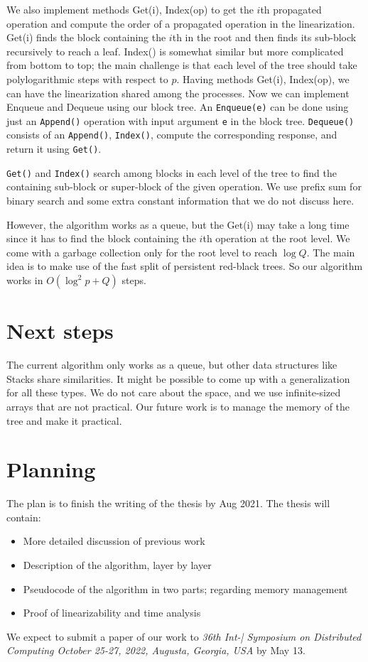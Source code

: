 \documentclass[12pt]{article}
\begin{document}
We also implement methods Get(i), Index(op) to get the $i$th propagated operation and compute the order of a propagated operation in the linearization. Get(i) finds the block containing the $i$th in the root and then finds its sub-block recursively to reach a leaf. Index() is somewhat similar but more complicated from bottom to top; the main challenge is that each level of the tree should take polylogarithmic steps with respect to $p$. Having methods Get(i), Index(op), we can have the linearization shared among the processes. Now we can implement Enqueue and Dequeue using our block tree. An \texttt{Enqueue(e)} can be done using just an \texttt{Append()} operation with input argument \texttt{e} in the block tree. \texttt{Dequeue()} consists of an \texttt{Append()}, \texttt{Index()}, compute the corresponding response, and return it using \texttt{Get()}.

\texttt{Get()} and \texttt{Index()} search among blocks in each level of the tree to find the containing sub-block or super-block of the given operation. We use prefix sum for binary search and some extra constant information that we do not discuss here.

However, the algorithm works as a queue, but the Get(i)  may take a long time since it has to find the block containing the $i$th operation at the root level. We come with a garbage collection only for the root level to reach $\log Q$. The main idea is to make use of the fast split of persistent red-black trees. So our algorithm works in $O(\log^2 p +Q)$ steps.

\section{Next steps}
The current algorithm only works as a queue, but other data structures like Stacks share similarities. It might be possible to come up with a generalization for all these types. We do not care about the space, and we use infinite-sized arrays that are not practical. Our future work is to manage the memory of the tree and make it practical.

\section{Planning}
The plan is to finish the writing of the thesis by Aug 2021. The thesis will contain:
\begin{itemize}
  \item More detailed discussion of previous work
  \item Description of the algorithm, layer by layer
  \item Pseudocode of the algorithm in two parts; regarding memory management
  \item Proof of linearizability and time analysis
\end{itemize}

We expect to submit a paper of our work to \textit{36th Int-| Symposium on Distributed Computing
October 25-27, 2022, Augusta, Georgia, USA} by May 13.

 

\end{document}

